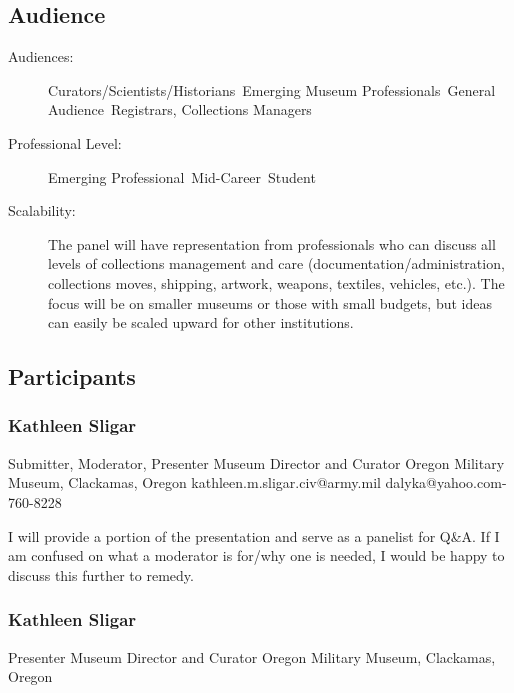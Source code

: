 \documentclass{report}
\begin{document}
              \subsection*{Audience}
                \begin{description}
                  \item [Audiences:]Curators/Scientists/Historians~Emerging Museum Professionals~General Audience~Registrars, Collections Managers~
                  \item[Professional Level:]Emerging Professional~Mid-Career~Student~
                \item[Scalability:] The panel will have representation from professionals who can discuss all levels of collections management and care (documentation/administration, collections moves, shipping, artwork, weapons, textiles, vehicles, etc.). The focus will be on smaller museums or those with small budgets, but ideas can easily be scaled upward for other institutions.

							
              \end{description}
            \subsection*{Participants}
              \subsubsection*{ Kathleen Sligar }
              Submitter, Moderator, Presenter\newline
              Museum Director and Curator\newline
              Oregon Military Museum, Clackamas, Oregon
              \newline
              kathleen.m.sligar.civ@army.mil\newline
              dalyka@yahoo.com-760-8228\newline

              I will provide a portion of the presentation and serve as a panelist for Q\&A. If I am confused on what a moderator is for/why one is needed, I would be happy to discuss this further to remedy.\newline


              

              
                \subsubsection*{ Kathleen Sligar }
                Presenter\newline
                Museum Director and Curator\newline
                Oregon Military Museum, Clackamas, Oregon
                \newline
                
\end{document}
